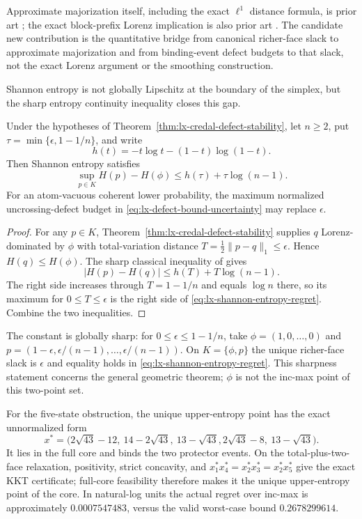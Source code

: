 \begingroup\sloppy
Approximate majorization itself, including the exact $\ell^1$ distance
formula, is prior art \citep{HorodeckiOppenheimSparaciari2018}; the exact
block-prefix Lorenz implication is also prior art
\citep{SanchezSorianoBranzeiLlorcaTijs2010}.  The candidate new contribution
is the quantitative bridge from canonical richer-face slack to approximate
majorization and from binding-event defect budgets to that slack, not the
exact Lorenz argument or the smoothing construction.
\par\endgroup

Shannon entropy is not globally Lipschitz at the boundary of the simplex,
but the sharp entropy continuity inequality closes this gap.

\begin{corollary}
\label{cor:lx-credal-shannon-stability}
Under the hypotheses of Theorem~\ref{thm:lx-credal-defect-stability}, let
$n\geq2$, put $\tau=\min\{\epsilon,1-1/n\}$, and write
\[
 h(t)=-t\log t-(1-t)\log(1-t).
\]
Then Shannon entropy satisfies
\[
 \sup_{p\in K}H(p)-H(\phi)
 \leq h(\tau)+\tau\log(n-1).                         \tag{SE}
 \label{eq:lx-shannon-entropy-regret}
\]
For an atom-vacuous coherent lower probability, the maximum normalized
uncrossing-defect budget in \eqref{eq:lx-defect-bound-uncertainty} may replace
$\epsilon$.
\end{corollary}

\begin{proof}
For any $p\in K$, Theorem~\ref{thm:lx-credal-defect-stability} supplies $q$
Lorenz-dominated by $\phi$ with total-variation distance
$T=\tfrac12\lVert p-q\rVert_1\leq\epsilon$.  Hence
$H(q)\leq H(\phi)$.  The sharp classical inequality of
\citet{Audenaert2007} gives
\[
 |H(p)-H(q)|\leq h(T)+T\log(n-1).
\]
The right side increases through $T=1-1/n$ and equals $\log n$ there, so its
maximum for $0\leq T\leq\epsilon$ is the right side of
\eqref{eq:lx-shannon-entropy-regret}.  Combine the two inequalities.
\end{proof}

The constant is globally sharp: for $0\leq\epsilon\leq1-1/n$, take
$\phi=(1,0,\ldots,0)$ and
$p=(1-\epsilon,\epsilon/(n-1),\ldots,\epsilon/(n-1))$.  On
$K=\{\phi,p\}$ the unique richer-face slack is $\epsilon$ and equality holds
in \eqref{eq:lx-shannon-entropy-regret}.  This sharpness statement concerns
the general geometric theorem; $\phi$ is not the inc-max point of this
two-point set.

For the five-state obstruction, the unique upper-entropy point has the exact
unnormalized form
\[
 x^*=\bigl(2\sqrt{43}-12,\ 14-2\sqrt{43},\ 13-\sqrt{43},
             2\sqrt{43}-8,\ 13-\sqrt{43}\bigr).
\]
It lies in the full core and binds the two protector events.  On the
total-plus-two-face relaxation, positivity, strict concavity, and
$x^*_1x^*_4=x^*_2x^*_3=x^*_2x^*_5$ give the exact KKT certificate; full-core
feasibility therefore makes it the unique upper-entropy point of the core.
In natural-log units the actual regret over inc-max is approximately
$0.0007547483$, versus the valid worst-case bound $0.2678299614$.

